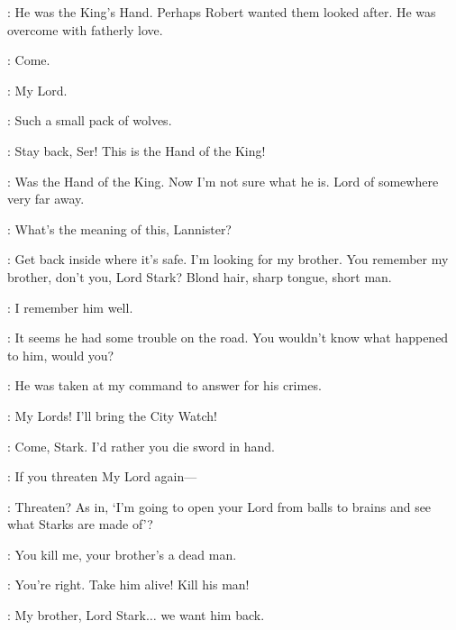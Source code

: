 \LITTLEFINGER: He was the King's Hand. Perhaps Robert wanted them looked after. He was overcome with fatherly love. 

\NED:  Come. 

\JORY: My Lord. 


\JAIME: Such a small pack of wolves. 

\JORY: Stay back, Ser! This is the Hand of the King! 

\JAIME: Was the Hand of the King. Now I'm not sure what he is. Lord of somewhere very far away. 

\LITTLEFINGER:  What's the meaning of this, Lannister? 

\JAIME: Get back inside where it's safe. I'm looking for my brother. You remember my brother, don't you, Lord Stark? Blond hair, sharp tongue, short man. 

\NED: I remember him well. 

\JAIME: It seems he had some trouble on the road. You wouldn't know what happened to him, would you? 

\NED: He was taken at my command to answer for his crimes. 


\LITTLEFINGER: My Lords! I'll bring the City Watch! 

\JAIME: Come, Stark. I'd rather you die sword in hand. 

\JORY: If you threaten My Lord again---

\JAIME: Threaten? As in, `I'm going to open your Lord from balls to brains and see what Starks are made of'? 

\NED: You kill me, your brother's a dead man. 

\JAIME: You're right.  Take him alive! Kill his man! 


\JAIME: My brother, Lord Stark$\ldots$ we want him back. 



